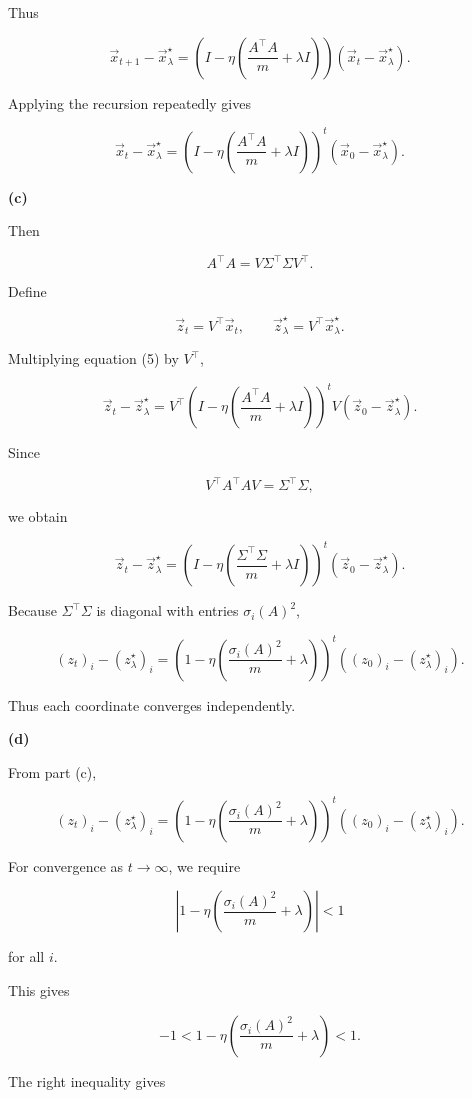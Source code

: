 \documentclass[
  12pt,
]{fphw}
\begin{document}
Thus

\[
\vec{x}_{t+1}-\vec{x}_\lambda^\star
=
\left(I-\eta\left(\frac{A^\top A}{m}+\lambda I\right)\right)
(\vec{x}_t-\vec{x}_\lambda^\star).
\]

Applying the recursion repeatedly gives

\[
\vec{x}_t-\vec{x}_\lambda^\star
=
\left(I-\eta\left(\frac{A^\top A}{m}+\lambda I\right)\right)^t
(\vec{x}_0-\vec{x}_\lambda^\star).
\]

\textbf{(c)}

Then

\[
A^\top A = V\Sigma^\top\Sigma V^\top.
\]

Define

\[
\vec{z}_t=V^\top\vec{x}_t, \qquad
\vec{z}_\lambda^\star=V^\top\vec{x}_\lambda^\star.
\]

Multiplying equation (5) by \(V^\top\),

\[
\vec{z}_t-\vec{z}_\lambda^\star
=
V^\top
\left(I-\eta\left(\frac{A^\top A}{m}+\lambda I\right)\right)^t
V
(\vec{z}_0-\vec{z}_\lambda^\star).
\]

Since

\[
V^\top A^\top A V=\Sigma^\top\Sigma,
\]

we obtain

\[
\vec{z}_t-\vec{z}_\lambda^\star
=
\left(I-\eta\left(\frac{\Sigma^\top\Sigma}{m}+\lambda I\right)\right)^t
(\vec{z}_0-\vec{z}_\lambda^\star).
\]

Because \(\Sigma^\top\Sigma\) is diagonal with entries \(\sigma_i(A)^2\),

\[
(z_t)_i-(z_\lambda^\star)_i
=
\left(
1-\eta\left(\frac{\sigma_i(A)^2}{m}+\lambda\right)
\right)^t
((z_0)_i-(z_\lambda^\star)_i).
\]

Thus each coordinate converges independently.

\textbf{(d)}

From part (c),

\[
(z_t)_i-(z_\lambda^\star)_i
=
\left(
1-\eta\left(\frac{\sigma_i(A)^2}{m}+\lambda\right)
\right)^t
((z_0)_i-(z_\lambda^\star)_i).
\]

For convergence as \(t\to\infty\), we require

\[
\left|
1-\eta\left(\frac{\sigma_i(A)^2}{m}+\lambda\right)
\right|<1
\]

for all \(i\).

This gives

\[
-1
<
1-\eta\left(\frac{\sigma_i(A)^2}{m}+\lambda\right)
<
1.
\]

The right inequality gives
\end{document}
